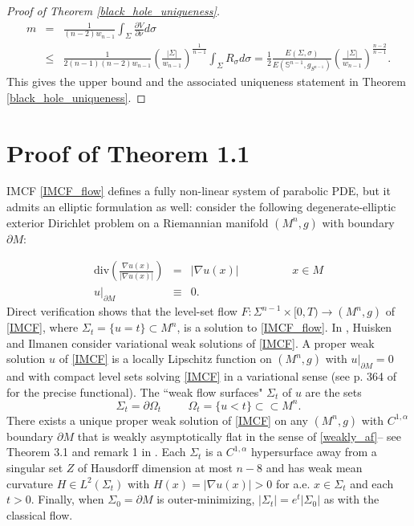 \documentclass[12pt,twoside]{article}
\theoremstyle{plain}
\theoremstyle{definition}
\theoremstyle{remark}
\numberwithin{equation}{section}
\begin{document}
\begin{proof}[Proof of Theorem \ref{black_hole_uniqueness}]
\begin{eqnarray*}
    m &=& \frac{1}{(n-2) w_{n-1}} \int_{\Sigma } \frac{\partial V}{\partial \nu} d\sigma \\
    &\leq& \frac{1}{2(n-1)(n-2)w_{n-1}} \left(\frac{|\Sigma|}{w_{n-1}} \right)^{\frac{1}{n-1}} \int_{\Sigma} R_{\sigma} d\sigma = \frac{1}{2} \frac{E(\Sigma,\sigma)}{E(\mathbb{S}^{n-1},g_{S^{n-1}})} \left( \frac{|\Sigma|}{w_{n-1}} \right)^{\frac{n-2}{n-1}}.
\end{eqnarray*}
This gives the upper bound and the associated uniqueness statement in Theorem \ref{black_hole_uniqueness}.
\end{proof}
\appendix
\section{Proof of Theorem 1.1}
 IMCF \eqref{IMCF_flow} defines a fully non-linear system of parabolic PDE, but it admits an elliptic formulation as well: consider the following degenerate-elliptic exterior Dirichlet problem on a Riemannian manifold $(M^{n},g)$ with boundary $\partial M$:

\begin{eqnarray} \label{IMCF}
   \text{div}\left(\frac{\nabla u(x)}{|\nabla u(x)|}\right) &=& |\nabla u(x)| \hspace{2cm} x \in M  \\
   u|_{\partial M} &\equiv& 0 \nonumber.
\end{eqnarray}
Direct verification shows that the level-set flow $F: \Sigma^{n-1} \times [0,T) \rightarrow (M^{n},g)$ of \eqref{IMCF}, where $\Sigma_{t}= \{ u =t \} \subset M^{n}$, is a solution to \eqref{IMCF_flow}. In \cite{HI}, Huisken and Ilmanen consider variational weak solutions of \eqref{IMCF}. A proper weak solution $u$ of \eqref{IMCF} is a locally Lipschitz function on $(M^{n},g)$ with $u|_{\partial M}=0$ and with compact level sets solving \eqref{IMCF} in a variational sense (see p. 364 of \cite{HI} for the precise functional). The ``weak flow surfaces" $\Sigma_{t}$ of $u$ are the sets 
\begin{equation}
 \Sigma_{t}= \partial \Omega_{t} \hspace{1cm} \Omega_{t}= \{ u < t \} \subset \subset M^{n}.   
\end{equation}
There exists a unique proper weak solution of \eqref{IMCF} on any $(M^{n},g)$ with $C^{1,\alpha}$ boundary $\partial M$ that is weakly asymptotically flat in the sense of \eqref{weakly_af}-- see Theorem 3.1 and remark 1 in \cite{HI}. Each $\Sigma_{t}$ is a $C^{1,\alpha}$ hypersurface away from a singular set $Z$ of Hausdorff dimension at most $n-8$ and has weak mean curvature $H \in L^{2}(\Sigma_{t})$ with $H(x)=|\nabla u(x)| >0$ for a.e. $x \in \Sigma_{t}$ and each $t > 0$. Finally, when $\Sigma_{0}=\partial M$ is outer-minimizing, $|\Sigma_{t}|= e^{t}|\Sigma_{0}|$ as with the classical flow.
\end{document}
